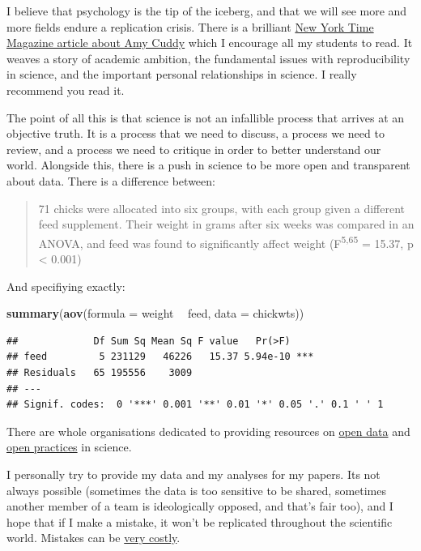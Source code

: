 \documentclass[
]{book}
\newenvironment{Shaded}{\begin{snugshade}}{\end{snugshade}}
\newcommand{\DataTypeTok}[1]{\textcolor[rgb]{0.13,0.29,0.53}{#1}}
\newcommand{\KeywordTok}[1]{\textcolor[rgb]{0.13,0.29,0.53}{\textbf{#1}}}
\newcommand{\NormalTok}[1]{#1}
\newcommand{\OperatorTok}[1]{\textcolor[rgb]{0.81,0.36,0.00}{\textbf{#1}}}
\newcommand{\StringTok}[1]{\textcolor[rgb]{0.31,0.60,0.02}{#1}}
\begin{document}
I believe that psychology is the tip of the iceberg, and that we will see more and more fields endure a replication crisis. There is a brilliant \href{https://www.nytimes.com/2017/10/18/magazine/when-the-revolution-came-for-amy-cuddy.html}{New York Time Magazine article about Amy Cuddy} which I encourage all my students to read. It weaves a story of academic ambition, the fundamental issues with reproducibility in science, and the important personal relationships in science. I really recommend you read it.

The point of all this is that science is not an infallible process that arrives at an objective truth. It is a process that we need to discuss, a process we need to review, and a process we need to critique in order to better understand our world.
Alongside this, there is a push in science to be more open and transparent about data. There is a difference between:

\begin{quote}
71 chicks were allocated into six groups, with each group given a different feed supplement. Their weight in grams after six weeks was compared in an ANOVA, and feed was found to significantly affect weight (F\textsuperscript{5,65} = 15.37, p \textless{} 0.001)
\end{quote}

And specifiying exactly:

\begin{Shaded}
\begin{Highlighting}[]
\KeywordTok{summary}\NormalTok{(}\KeywordTok{aov}\NormalTok{(}\DataTypeTok{formula =}\NormalTok{ weight }\OperatorTok{~}\StringTok{ }\NormalTok{feed, }\DataTypeTok{data =}\NormalTok{ chickwts))}
\end{Highlighting}
\end{Shaded}

\begin{verbatim}
##             Df Sum Sq Mean Sq F value   Pr(>F)    
## feed         5 231129   46226   15.37 5.94e-10 ***
## Residuals   65 195556    3009                     
## ---
## Signif. codes:  0 '***' 0.001 '**' 0.01 '*' 0.05 '.' 0.1 ' ' 1
\end{verbatim}

There are whole organisations dedicated to providing resources on \href{https://opendatahandbook.org/guide/en/why-open-data/}{open data} and \href{https://osf.io/}{open practices} in science.

I personally try to provide my data and my analyses for my papers. Its not always possible (sometimes the data is too sensitive to be shared, sometimes another member of a team is ideologically opposed, and that's fair too), and I hope that if I make a mistake, it won't be replicated throughout the scientific world. Mistakes can be \href{https://www.bbc.co.uk/news/uk-scotland-edinburgh-east-fife-53893101}{very costly}.
\end{document}
